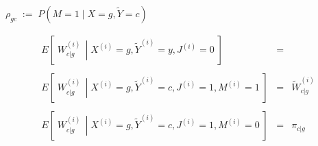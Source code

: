 $\rho_{gc} \;:=\; P\!\left(M=1\;\vert\;X=g,\widetilde{Y}=c\right)$

\begin{equation*}
\begin{array}{lcl}
E\!\left[\;\left.W^{(i)}_{c \vert g}\,\;\right\vert\;X^{(i)}=g,\widetilde{Y}^{(i)}=y,J^{(i)}=0\;\right]
&=& 
\\ \\
E\!\left[\;\left.W^{(i)}_{c \vert g}\,\;\right\vert\;X^{(i)}=g,\widetilde{Y}^{(i)}=c,J^{(i)}=1,M^{(i)}=1\;\right]
&=& \widetilde{W}^{(i)}_{c \vert g}
\\ \\
E\!\left[\;\left.W^{(i)}_{c \vert g}\,\;\right\vert\;X^{(i)}=g,\widetilde{Y}^{(i)}=c,J^{(i)}=1,M^{(i)}=0\;\right]
&=& \pi_{c \vert g}
\end{array}
\end{equation*}

